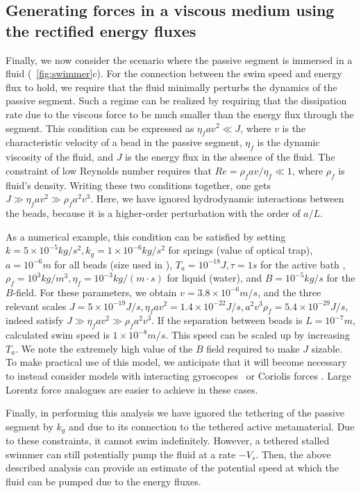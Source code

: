 \documentclass[
 preprint,
 preprintnumbers,
 amsmath,amssymb,
 aps,
 pre,
 longbibliography,
 superscriptaddress,
 10pt, twocolumn
]{revtex4-1}
\begin{document}
\subsection{Generating forces in a viscous medium using the rectified energy fluxes}
\label{sec:pumping}
Finally, we now consider the scenario where the passive segment is immersed in a fluid (\figurename~\ref{fig:swimmer}c). For the connection between the swim speed and energy flux to hold, we require that the fluid minimally perturbs the dynamics of the passive segment. Such a regime can be realized by requiring that the dissipation rate due to the viscous force to be much smaller than the energy flux through the segment. This condition can be expressed as $\eta_f a v^2 \ll J$, where $v$ is the characteristic velocity of a bead in the passive segment, $\eta_f$ is the dynamic viscosity of the fluid, and $J$ is the energy flux in the absence of the fluid.
The constraint of low Reynolds number requires that $Re = \rho_f a v /\eta_f \ll 1$, where $\rho_f$ is fluid's density.
Writing these two conditions together, one gets $J \gg \eta_f a v^2 \gg \rho_f a^2 v^3$. 
Here, we have ignored hydrodynamic interactions between the beads, because it is a higher-order perturbation with the order of $a/L$. 

As a numerical example, this condition can be satisfied by setting $k=5\times 10^{-5} kg/s^2, k_g=1\times 10^{-6} kg/s^2$ for springs (value of optical trap), $a=10^{-6}m$ for all beads (size used in \cite{Leoni2009BasicSwimmer}), $T_a=10^{-18} J, \tau=1s$ for the active bath \cite{Wu2000ParticleDiffusion}, $\rho_f=10^3kg/m^3, \eta_f=10^{-3}kg/(m\cdot s)$ for liquid (water), and $B=10^{-5} kg/s$ for the $B$-field.
For these parameters, we obtain $v=3.8\times 10^{-6}m/s$, and the three relevant scales $J=5\times 10^{-19}J/s, \eta_f av^2=1.4\times 10^{-22}J/s, a^2v^3\rho_f=5.4\times 10^{-29}J/s$, indeed satisfy $J \gg \eta_f a v^2 \gg \rho_f a^2 v^3$.
If the separation between beads is $L=10^{-7}m$, calculated swim speed is $1\times 10^{-8} m/s$.
This speed can be scaled up by increasing $T_a$.
We note the extremely high value of the $B$ field required to make $J$ sizable. To make practical use of this model, we anticipate that it will become necessary to instead consider models with interacting gyroscopes~\cite{Nash2015TopologicalMechanics} or Coriolis forces \cite{Kahlert2012MagnetizingComplex}. Large Lorentz force analogues are easier to achieve in these cases. 

Finally, in performing this analysis we have ignored the tethering of the passive segment by $k_g$ and due to its connection to the tethered active metamaterial. Due to these constraints, it cannot swim indefinitely. However, a tethered stalled swimmer can still potentially pump the fluid \cite{Leoni2009BasicSwimmer,Golestanian2008AnalyticResults} at a rate $-V_s$. Then, the above described analysis can provide an estimate of the potential speed at which the fluid can be pumped due to the energy fluxes. 
\end{document}
